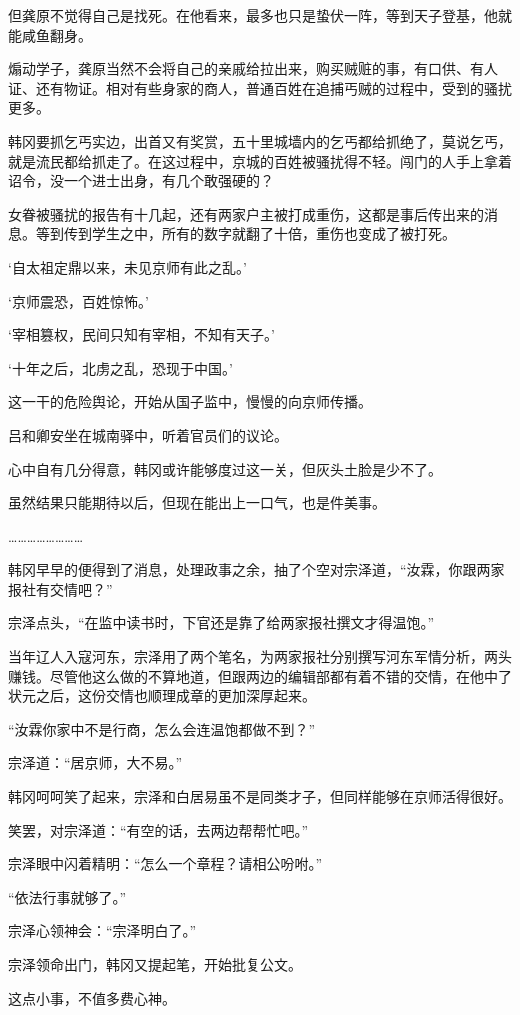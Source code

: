 但龚原不觉得自己是找死。在他看来，最多也只是蛰伏一阵，等到天子登基，他就能咸鱼翻身。

煽动学子，龚原当然不会将自己的亲戚给拉出来，购买贼赃的事，有口供、有人证、还有物证。相对有些身家的商人，普通百姓在追捕丐贼的过程中，受到的骚扰更多。

韩冈要抓乞丐实边，出首又有奖赏，五十里城墙内的乞丐都给抓绝了，莫说乞丐，就是流民都给抓走了。在这过程中，京城的百姓被骚扰得不轻。闯门的人手上拿着诏令，没一个进士出身，有几个敢强硬的？

女眷被骚扰的报告有十几起，还有两家户主被打成重伤，这都是事后传出来的消息。等到传到学生之中，所有的数字就翻了十倍，重伤也变成了被打死。

‘自太祖定鼎以来，未见京师有此之乱。’

‘京师震恐，百姓惊怖。’

‘宰相篡权，民间只知有宰相，不知有天子。’

‘十年之后，北虏之乱，恐现于中国。’

这一干的危险舆论，开始从国子监中，慢慢的向京师传播。

吕和卿安坐在城南驿中，听着官员们的议论。

心中自有几分得意，韩冈或许能够度过这一关，但灰头土脸是少不了。

虽然结果只能期待以后，但现在能出上一口气，也是件美事。

……………………

韩冈早早的便得到了消息，处理政事之余，抽了个空对宗泽道，“汝霖，你跟两家报社有交情吧？”

宗泽点头，“在监中读书时，下官还是靠了给两家报社撰文才得温饱。”

当年辽人入寇河东，宗泽用了两个笔名，为两家报社分别撰写河东军情分析，两头赚钱。尽管他这么做的不算地道，但跟两边的编辑部都有着不错的交情，在他中了状元之后，这份交情也顺理成章的更加深厚起来。

“汝霖你家中不是行商，怎么会连温饱都做不到？”

宗泽道：“居京师，大不易。”

韩冈呵呵笑了起来，宗泽和白居易虽不是同类才子，但同样能够在京师活得很好。

笑罢，对宗泽道：“有空的话，去两边帮帮忙吧。”

宗泽眼中闪着精明：“怎么一个章程？请相公吩咐。”

“依法行事就够了。”

宗泽心领神会：“宗泽明白了。”

宗泽领命出门，韩冈又提起笔，开始批复公文。

这点小事，不值多费心神。

